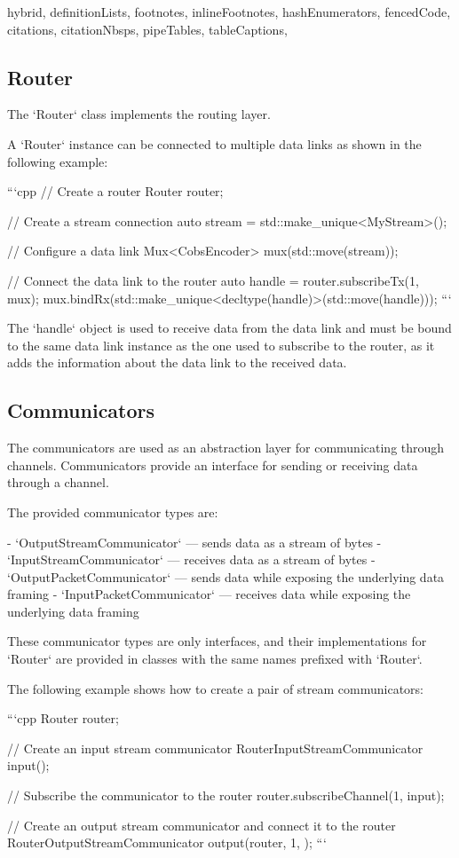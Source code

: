 \begin{markdown*}{%
  hybrid,
  definitionLists,
  footnotes,
  inlineFootnotes,
  hashEnumerators,
  fencedCode,
  citations,
  citationNbsps,
  pipeTables,
  tableCaptions,
}
\subsection{Router}

The `Router` class implements the routing layer.

A `Router` instance can be connected to multiple data links as shown in the following example:

```cpp
// Create a router
Router router;

// Create a stream connection
auto stream = std::make_unique<MyStream>();

// Configure a data link
Mux<CobsEncoder> mux(std::move(stream));

// Connect the data link to the router
auto handle = router.subscribeTx(1, mux);
mux.bindRx(std::make_unique<decltype(handle)>(std::move(handle)));
```

The `handle` object is used to receive data from the data link and must be bound to the same data link instance as the one used to subscribe to the router, as it adds the information about the data link to the received data.

\subsection{Communicators}

The communicators are used as an abstraction layer for communicating through channels. Communicators provide an interface for sending or receiving data through a channel.

The provided communicator types are:

- `OutputStreamCommunicator` --- sends data as a stream of bytes
- `InputStreamCommunicator` --- receives data as a stream of bytes
- `OutputPacketCommunicator` --- sends data while exposing the underlying data framing
- `InputPacketCommunicator` --- receives data while exposing the underlying data framing

These communicator types are only interfaces, and their implementations for `Router` are provided in classes with the same names prefixed with `Router`.

The following example shows how to create a pair of stream communicators:

```cpp
Router router;

// Create an input stream communicator
RouterInputStreamCommunicator input({});

// Subscribe the communicator to the router
router.subscribeChannel(1, input);

// Create an output stream communicator and connect it to the router
RouterOutputStreamCommunicator output(router, 1, {});
```


\end{markdown*}
